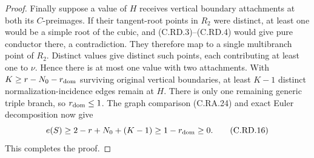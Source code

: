 \begin{proof}
Finally suppose a value of $H$ receives vertical
boundary attachments at both its $C$-preimages.
If their tangent-root points in $R_2$ were distinct,
at least one would be a simple root of the cubic,
and (C.RD.3)--(C.RD.4) would give pure conductor
there, a contradiction. They therefore map to a
single multibranch point of $R_2$. Distinct values
give distinct such points, each contributing at
least one to $\nu$. Hence there is at most one
value with two attachments. With
$K\ge r-N_0-r_{\rm dom}$ surviving original
vertical boundaries, at least $K-1$ distinct
normalization-incidence edges remain at $H$.
There is only one remaining generic triple branch,
so $r_{\rm dom}\le1$. The graph comparison
(C.RA.24) and exact Euler decomposition now give
\[
 e(S)\ge2-r+N_0+(K-1)
                         \ge1-r_{\rm dom}\ge0.
\tag{C.RD.16}\label{cdp:eq:C.RD.16}
\]
This completes the proof.
\end{proof}


